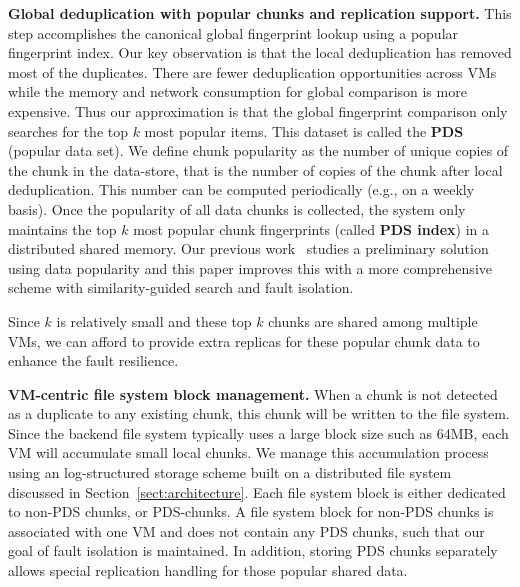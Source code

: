 \textbf{Global deduplication with popular chunks and replication support.}
This step accomplishes the canonical global fingerprint lookup using a popular fingerprint index.
Our key observation is that the local deduplication has removed most of the duplicates.
There are fewer deduplication opportunities across VMs while the memory and network
consumption for global comparison is more expensive.
Thus our approximation is that the global fingerprint comparison only searches for the top $k$
most popular items. This dataset is called the \textbf{PDS} (popular data set). 
We define chunk popularity as the number of unique copies of the chunk in the data-store,
that is the number of copies of the chunk after local deduplication.
This number can be computed periodically (e.g., on a weekly basis).
Once the popularity of all data chunks is collected, the system only maintains the top $k$
most popular chunk fingerprints (called \textbf{PDS index}) in a distributed shared memory.  
Our previous work~\cite{WeiZhangIEEE} studies a preliminary solution using data popularity and this
paper improves this with a more comprehensive scheme with  similarity-guided search and fault isolation.

Since $k$ is relatively small and these top $k$ chunks are shared among multiple VMs, 
we can afford to provide extra replicas for these popular chunk data to enhance the fault resilience.

\textbf{VM-centric file system block management.}
When a chunk is not detected as a duplicate to any existing chunk, this chunk will be written
to the file system. Since the backend file system typically uses a large block size such as 64MB, each VM will 
accumulate small local chunks. We manage this accumulation process using an log-structured storage scheme built
on a distributed file system discussed in Section~\ref{sect:architecture}.
Each file system block is either dedicated to non-PDS chunks, or PDS-chunks.
A file system block for non-PDS chunks is associated with one VM and does not contain
any PDS chunks, such that our goal of fault isolation is maintained.
In addition, storing PDS chunks separately allows special replication handling for those popular shared data. 


